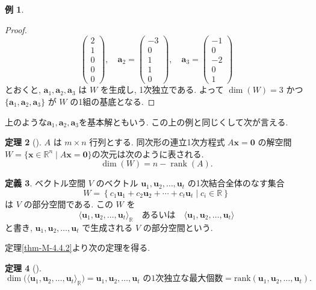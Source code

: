 \documentclass[dvipdfmx,a4paper,11pt]{article} %
\theoremstyle{definition}
\newtheorem{thm}{定理}[section]
\newtheorem{defn}[thm]{定義}
\newtheorem{eg}[thm]{例}
\begin{document}
\begin{eg}
\begin{proof}
\[\begin{pmatrix}
2\\
1\\
0\\
0\\
0
\end{pmatrix},
\quad
\bm{a}_2=
\begin{pmatrix}
-3\\
0\\
1\\
1\\
0
\end{pmatrix},
\quad
\bm{a}_3=
\begin{pmatrix}
-1\\
0\\
-2\\
0\\
1
\end{pmatrix}
\]
とおくと, $\bm{a}_1,\bm{a}_2,\bm{a}_3$ は $W$ を生成し, 1次独立である. よって
\(
\dim(W)=3
\)
かつ$\{\bm{a}_1,\bm{a}_2,\bm{a}_3\}$ が $W$ の1組の基底となる.
\end{proof}
\end{eg}

上のような$\bm{a}_1,\bm{a}_2,\bm{a}_3$を基本解ともいう. 
この上の例と同じくして次が言える.
\begin{thm}[{\cite[定理4.4.3]{M}}] 
\label{thm-M-4.4.3}
$A$ は $m\times n$ 行列とする. 同次形の連立1次方程式 $A\bm{x}=\bm{0}$ の解空間\(W=\{\bm{x}\in\mathbb{R}^n\mid A\bm{x}=\bm{0}\}\)の次元は次のように表される.
\[
\dim(W)=n-\operatorname{rank}(A).
\]
\end{thm}

\begin{defn}
ベクトル空間 $V$ のベクトル $\bm{u}_1,\bm{u}_2,\ldots,\bm{u}_t$ の1次結合全体のなす集合
\[
W=
\left\{
c_1\bm{u}_1+c_2\bm{u}_2+\cdots+c_t\bm{u}_t
\mathrel{}\middle|\mathrel{}
c_i\in\mathbb{R}
\right\}
\]
は $V$ の部分空間である. この $W$ を
\[
\langle \bm{u}_1,\bm{u}_2,\ldots,\bm{u}_t\rangle_{\mathbb{R}}
\quad\text{あるいは}\quad
\langle \bm{u}_1,\bm{u}_2,\ldots,\bm{u}_t\rangle
\]
と書き, $\bm{u}_1,\bm{u}_2,\ldots,\bm{u}_t$ で生成される $V$ の部分空間という.
\end{defn}
定理\ref{thm-M-4.4.2}より次の定理を得る.

\begin{thm}[{\cite[定理4.4.4]{M}}] 
\[
\dim\bigl(\langle \bm{u}_1,\bm{u}_2,\ldots,\bm{u}_t\rangle_{\mathbb{R}}\bigr)
=
\bm{u}_1,\bm{u}_2,\ldots,\bm{u}_t\text{ の1次独立な最大個数}
=
\mathrm{rank}(\bm{u}_1,\bm{u}_2,\ldots,\bm{u}_t).
\]
\end{thm}
\end{document}

